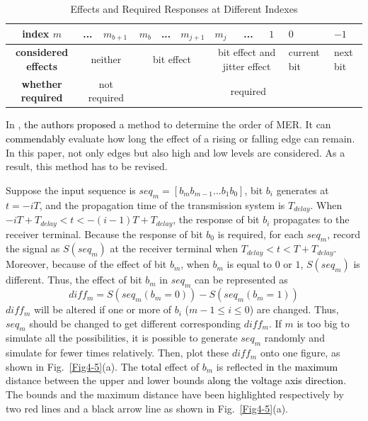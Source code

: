 \documentclass[conference]{IEEEtran}
\begin{document}
\begin{table}[b]
\caption{Effects and Required Responses at Different Indexes}
\label{TabI}
    \begin{center}
    \begin{tabular}{|p{2.3cm}
                    |p{0.8cm}|p{0.8cm}|p{0.8cm}|p{0.8cm}|p{0.8cm}|p{0.8cm}|p{0.8cm}|p{0.8cm}
                    |p{1.25cm}|p{1.25cm}|}\hline
        \multicolumn{1}{|c|}{\textbf{index $m$}}&
            ...&
            $m_{b+1}$&
            $m_b$&
            ...&
            $m_{j+1}$&
            $m_j$&
            ...&
            $1$&
            $0$&
            $-1$\\\hline
        \multicolumn{1}{|c|}{\textbf{considered effects}}&
            \multicolumn{2}{c|}{neither}&
            \multicolumn{3}{c|}{bit effect}&
            \multicolumn{3}{c|}{bit effect and jitter effect}&
            current bit&next bit\\\hline
        \multicolumn{1}{|c|}{\textbf{whether required}}&
            \multicolumn{2}{c|}{not required}&
            \multicolumn{8}{c|}{required}\\\hline
    \end{tabular}
    \end{center}
\end{table}

In \cite{b9}, \textcolor{black}{the authors proposed} a method to determine the order of MER. It can \textcolor{black}{commendably} evaluate how long the effect of a rising or falling edge can remain. In this paper, not only edges but also high and low levels are considered.
\color{black}
As a result, this method has to be revised.

Suppose the input sequence is $seq_m=[b_mb_{m-1}...b_1b_0]$, bit $b_i$ generates at $t=-iT$, and the propagation time of the transmission system is $T_{delay}$. When $-iT+T_{delay}<t<-(i-1)T+T_{delay}$, the response of bit $b_i$ propagates to the receiver terminal. Because the response of bit $b_0$ is required, for each $seq_m$, record the signal as $S(seq_m)$ at the receiver terminal when $T_{delay}<t<T+T_{delay}$. Moreover, because of the effect of bit $b_m$, when $b_m$ is equal to $0$ or $1$, $S(seq_m)$ is different. Thus, the effect of bit $b_m$ in $seq_m$ can be represented as
\color{black}
\begin{equation}
diff_m=S(seq_m(b_m=0))-S(seq_m(b_m=1))
\label{eq1}
\end{equation}
\color{black}
$diff_m$ will be altered if one or more of $b_i$ ($m-1\leq i\leq0$) are changed. Thus, $seq_m$ should be changed to get different corresponding $diff_m$.
\color{black}
If $m$ is too big to simulate all the possibilities, it is possible to generate $seq_m$ randomly and simulate for fewer times relatively. Then, plot these $diff_m$ onto one figure, as shown in Fig.~\ref{Fig4-5}(a). The \textcolor{black}{total} effect of $b_m$ is reflected \textcolor{black}{in} the \textcolor{black}{maximum} distance between the upper and lower bounds \textcolor{black}{along the voltage axis direction}.
\color{black}
The bounds and the maximum distance have been highlighted respectively by two red lines and a black arrow line as shown in Fig.~\ref{Fig4-5}(a).
\end{document}
